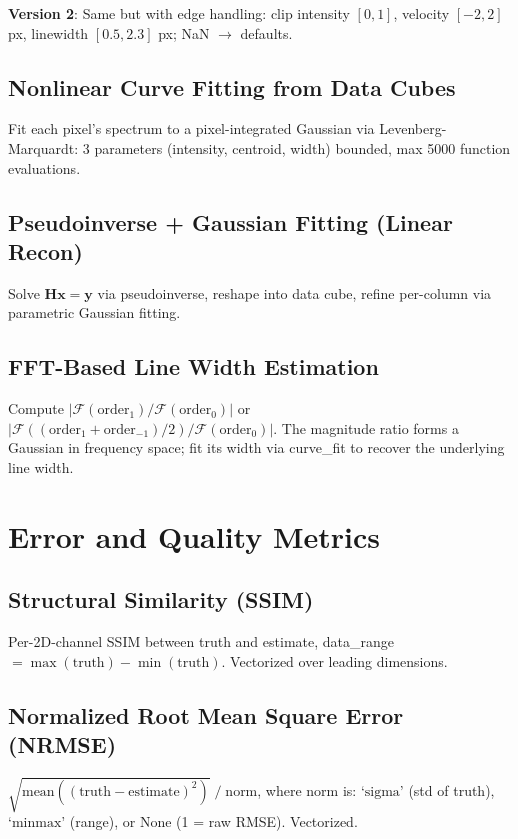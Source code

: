 \documentclass[11pt,a4paper]{article}
\begin{document}
\textbf{Version 2}: Same but with edge handling: clip intensity $[0,1]$, velocity $[-2,2]$ px, linewidth $[0.5,2.3]$ px; NaN $\rightarrow$ defaults.

\subsection{Nonlinear Curve Fitting from Data Cubes}
Fit each pixel's spectrum to a pixel-integrated Gaussian via Levenberg-Marquardt: 3 parameters (intensity, centroid, width) bounded, max 5000 function evaluations.

\subsection{Pseudoinverse + Gaussian Fitting (Linear Recon)}
Solve $\mathbf{H}\mathbf{x} = \mathbf{y}$ via pseudoinverse, reshape into data cube, refine per-column via parametric Gaussian fitting.

\subsection{FFT-Based Line Width Estimation}
Compute $|\mathcal{F}(\text{order}_1) / \mathcal{F}(\text{order}_0)|$ or $|\mathcal{F}((\text{order}_1+\text{order}_{-1})/2) / \mathcal{F}(\text{order}_0)|$. The magnitude ratio forms a Gaussian in frequency space; fit its width via curve\_fit to recover the underlying line width.

\section{Error and Quality Metrics}

\subsection{Structural Similarity (SSIM)}
Per-2D-channel SSIM between truth and estimate, data\_range $= \max(\text{truth}) - \min(\text{truth})$. Vectorized over leading dimensions.

\subsection{Normalized Root Mean Square Error (NRMSE)}
$\sqrt{\text{mean}((\text{truth} - \text{estimate})^2)}\;/\;\text{norm}$, where norm is: $\text{`sigma'}$ (std of truth), $\text{`minmax'}$ (range), or $\text{None}$ (1 = raw RMSE). Vectorized.
\end{document}

